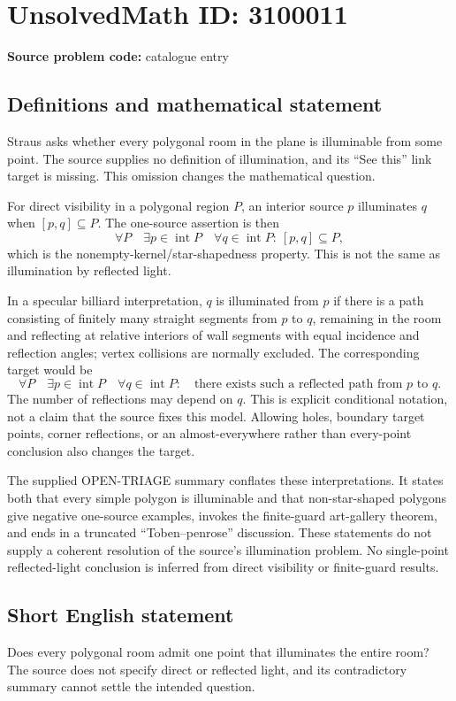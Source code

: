 \documentclass[11pt]{article}
\begin{document}
\section*{UnsolvedMath ID: 3100011}
\textbf{Source problem code:} catalogue entry
\subsection{Definitions and mathematical statement}
Straus asks whether every polygonal room in the plane is illuminable from some point. The source supplies no definition of illumination, and its ``See this'' link target is missing. This omission changes the mathematical question.

For direct visibility in a polygonal region \(P\), an interior source \(p\) illuminates \(q\) when \([p,q]\subseteq P\). The one-source assertion is then
\[
\forall P\quad\exists p\in\operatorname{int}P\quad
\forall q\in\operatorname{int}P:\ [p,q]\subseteq P,
\]
which is the nonempty-kernel/star-shapedness property. This is not the same as illumination by reflected light.

In a specular billiard interpretation, \(q\) is illuminated from \(p\) if there is a path consisting of finitely many straight segments from \(p\) to \(q\), remaining in the room and reflecting at relative interiors of wall segments with equal incidence and reflection angles; vertex collisions are normally excluded. The corresponding target would be
\[
\forall P\quad\exists p\in\operatorname{int}P\quad
\forall q\in\operatorname{int}P:\quad
\text{there exists such a reflected path from }p\text{ to }q.
\]
The number of reflections may depend on \(q\). This is explicit conditional notation, not a claim that the source fixes this model. Allowing holes, boundary target points, corner reflections, or an almost-everywhere rather than every-point conclusion also changes the target.

The supplied OPEN-TRIAGE summary conflates these interpretations. It states both that every simple polygon is illuminable and that non-star-shaped polygons give negative one-source examples, invokes the finite-guard art-gallery theorem, and ends in a truncated ``Toben--penrose'' discussion. These statements do not supply a coherent resolution of the source's illumination problem. No single-point reflected-light conclusion is inferred from direct visibility or finite-guard results.
\subsection{Short English statement}
Does every polygonal room admit one point that illuminates the entire room? The source does not specify direct or reflected light, and its contradictory summary cannot settle the intended question.
\end{document}

